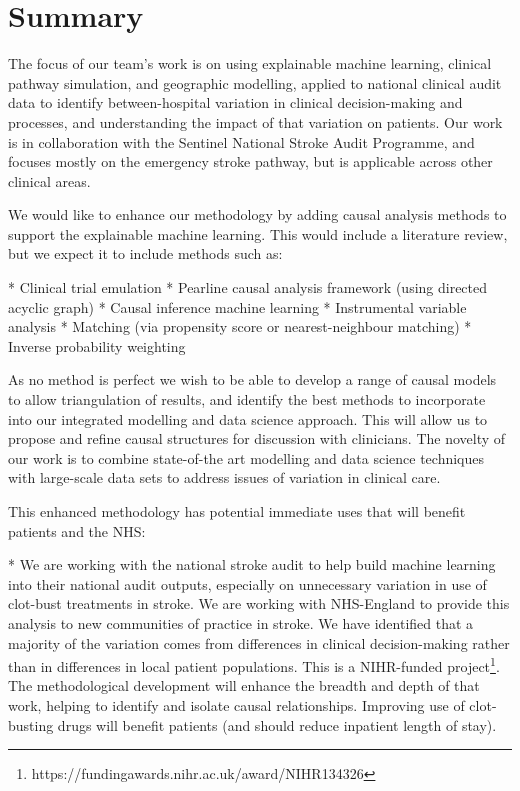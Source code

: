 \section*{Summary}


The focus of our team's work is on using explainable machine learning, clinical pathway simulation, and geographic modelling, applied to national clinical audit data to identify between-hospital variation in clinical decision-making and processes, and understanding the impact of that variation on patients. Our work is in collaboration with the Sentinel National Stroke Audit Programme, and focuses mostly on the emergency stroke pathway, but is applicable across other clinical areas.

We would like to enhance our methodology by adding causal analysis methods to support the explainable machine learning. This would include a literature review, but we expect it to include methods such as:

\begin{markdown}
* Clinical trial emulation
* Pearline causal analysis framework (using directed acyclic graph)
* Causal inference machine learning
* Instrumental variable analysis
* Matching (via propensity score or nearest-neighbour matching)
* Inverse probability weighting
\end{markdown}

As no method is perfect we wish to be able to develop a range of causal models to allow triangulation of results, and identify the best methods to incorporate into our integrated modelling and data science approach. This will allow us to propose and refine causal structures for discussion with clinicians. The novelty of our work is to combine state-of-the art modelling and data science techniques with large-scale data sets to address issues of variation in clinical care.

This enhanced methodology has potential immediate uses that will benefit patients and the NHS:

* We are working with the national stroke audit to help build machine learning into their national audit outputs, especially on unnecessary variation in use of clot-bust treatments in stroke. We are working with NHS-England to provide this analysis to new communities of practice in stroke. We have identified that a majority of the variation comes from differences in clinical decision-making rather than in differences in local patient populations. This is a NIHR-funded project\footnote{https://fundingawards.nihr.ac.uk/award/NIHR134326}. The methodological development will enhance the breadth and depth of that work, helping to identify and isolate causal relationships. Improving use of clot-busting drugs will benefit patients (and should reduce inpatient length of stay).

